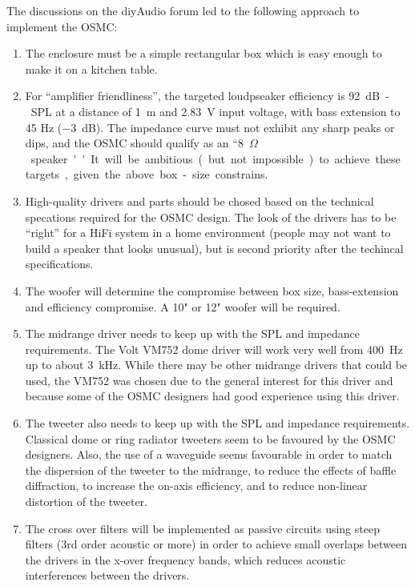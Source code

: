 \documentclass[12pt,a4paper]{article}
\begin{document}
\clearpage

The discussions on the diyAudio forum led to the following approach to implement the OSMC:
\begin{enumerate}

\item The enclosure must be a simple rectangular box which is easy enough to make it on a kitchen table.

\item For ``amplifier friendliness'', the targeted loudpseaker efficiency is \SI{92}{dB-SPL} at a distance of \SI{1}{m} and \SI{2.83}{V} input voltage, with bass extension to 45 Hz (\SI{-3}{dB}). The impedance curve must not exhibit any sharp peaks or dips, and the OSMC should qualify as an ``\SI{8}{$\Omega$} speaker''. It will be ambitious (but not impossible) to achieve these targets, given the above box-size constrains.

\item High-quality drivers and parts should be chosed based on the technical specations required for the OSMC design. The look of the drivers has to be ``right'' for a HiFi system in a home environment (people may not want to build a speaker that looks unusual), but is second priority after the techincal specifications.

\item The woofer will determine the compromise between box size, bass-extension and efficiency compromise. A 10" or 12" woofer will be required.

\item The midrange driver needs to keep up with the SPL and impedance requirements. The Volt VM752 dome driver will work very well from \SI{400}{Hz} up to about \SI{3}{kHz}. While there may be other midrange drivers that could be used, the VM752 was chosen due to the general interest for this driver and because some of the OSMC designers had good experience using this driver.

\item The tweeter also needs to keep up with the SPL and impedance requirements. Classical dome or ring radiator tweeters seem to be favoured by the OSMC designers. Also, the use of a waveguide seems favourable in order to match the dispersion of the tweeter to the midrange, to reduce the effects of baffle diffraction, to increase the on-axis efficiency, and to reduce non-linear distortion of the tweeter.

\item The cross over filters will be implemented as passive circuits using steep filters (3rd order acoustic or more) in order to achieve small overlaps between the drivers in the x-over frequency bands, which reduces acoustic interferences between the drivers.

\end{enumerate}
\end{document}
